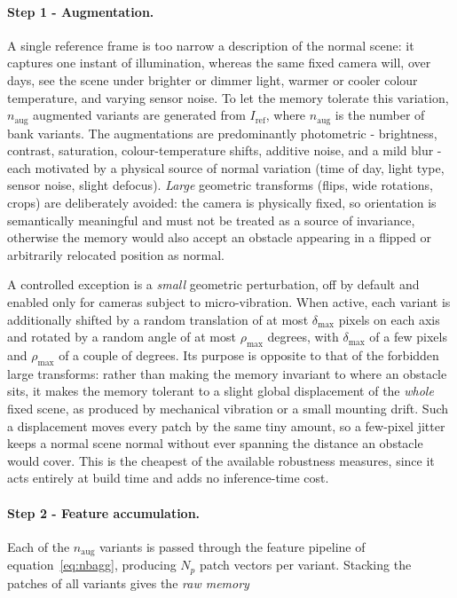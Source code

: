 \paragraph{Step 1 - Augmentation.} A single reference frame is too
narrow a description of the normal scene: it captures one instant of illumination,
whereas the same fixed camera will, over days, see the scene under brighter or
dimmer light, warmer or cooler colour temperature, and varying sensor noise. To
let the memory tolerate this variation, $n_{\mathrm{aug}}$ augmented variants are
generated from $I_{\mathrm{ref}}$, where $n_{\mathrm{aug}}$ is the number of bank
variants. The augmentations are predominantly photometric - brightness, contrast,
saturation, colour-temperature shifts, additive noise, and a mild blur - each
motivated by a physical source of normal variation (time of day, light type,
sensor noise, slight defocus). \emph{Large} geometric transforms (flips, wide
rotations, crops) are deliberately avoided: the camera is physically fixed, so
orientation is semantically meaningful and must not be treated as a source of
invariance, otherwise the memory would also accept an obstacle appearing in a
flipped or arbitrarily relocated position as normal.

A controlled exception is a \emph{small} geometric perturbation, off by default
and enabled only for cameras subject to micro-vibration. When active, each
variant is additionally shifted by a random translation of at most
$\delta_{\max}$ pixels on each axis and rotated by a random angle of at most
$\rho_{\max}$ degrees, with $\delta_{\max}$ of a few pixels and $\rho_{\max}$ of a
couple of degrees. Its purpose is opposite to that of the forbidden large
transforms: rather than making the memory invariant to where an obstacle sits, it
makes the memory tolerant to a slight global displacement of the \emph{whole}
fixed scene, as produced by mechanical vibration or a small mounting drift. Such a
displacement moves every patch by the same tiny amount, so a few-pixel jitter
keeps a normal scene normal without ever spanning the distance an obstacle would
cover. This is the cheapest of the available robustness measures, since it acts
entirely at build time and adds no inference-time cost. 

\paragraph{Step 2 - Feature accumulation.} Each of the $n_{\mathrm{aug}}$ variants
is passed through the feature pipeline of equation~\eqref{eq:nbagg}, producing
$N_p$ patch vectors per variant. Stacking the patches of all variants gives the
\emph{raw memory}


